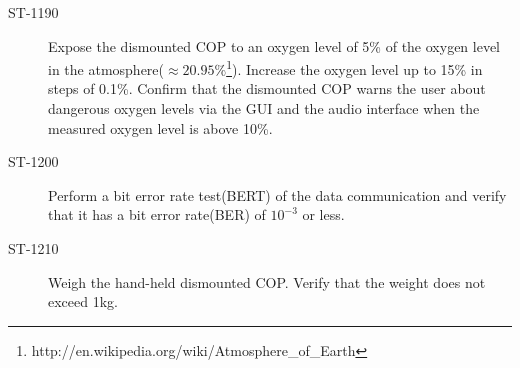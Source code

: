 \begin{description}
\item[ST-1190] Expose the dismounted COP to an oxygen level of 5\% of the oxygen level in the atmosphere($\approx 20.95\%$\footnote{http://en.wikipedia.org/wiki/Atmosphere\_of\_Earth}). Increase the oxygen level up to 15\% in steps of 0.1\%. Confirm that the dismounted COP warns the user about dangerous oxygen levels via the GUI and the audio interface when the measured oxygen level is above 10\%. 

\item[ST-1200] Perform a bit error rate test(BERT) of the data communication and verify that it has a bit error rate(BER) of $10^{-3}$ or less. 

\item[ST-1210] Weigh the hand-held dismounted COP. Verify that the weight does not exceed 1kg. 

\end{description}


